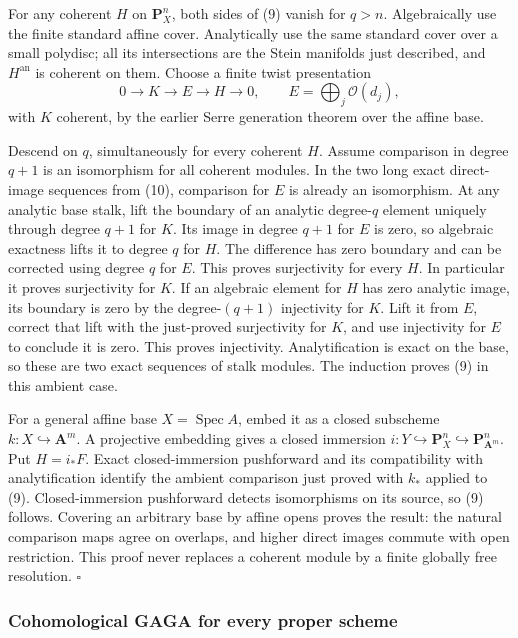 \documentclass[11pt]{article}
\begin{document}
For any coherent \(H\) on \(\mathbf P^n_X\), both sides of (9) vanish
for \(q>n\). Algebraically use the finite standard affine cover.
Analytically use the same standard cover over a small polydisc; all its
intersections are the Stein manifolds just described, and
\(H^{\mathrm{an}}\) is coherent on them. Choose a finite twist
presentation \[
0\to K\to E\to H\to0,
\qquad E=\bigoplus_j\mathcal O(d_j),
\tag{10}
\] with \(K\) coherent, by the earlier Serre generation theorem over the
affine base.

Descend on \(q\), simultaneously for every coherent \(H\). Assume
comparison in degree \(q+1\) is an isomorphism for all coherent modules.
In the two long exact direct-image sequences from (10), comparison for
\(E\) is already an isomorphism. At any analytic base stalk, lift the
boundary of an analytic degree-\(q\) element uniquely through degree
\(q+1\) for \(K\). Its image in degree \(q+1\) for \(E\) is zero, so
algebraic exactness lifts it to degree \(q\) for \(H\). The difference
has zero boundary and can be corrected using degree \(q\) for \(E\).
This proves surjectivity for every \(H\). In particular it proves
surjectivity for \(K\). If an algebraic element for \(H\) has zero
analytic image, its boundary is zero by the degree-\((q+1)\) injectivity
for \(K\). Lift it from \(E\), correct that lift with the just-proved
surjectivity for \(K\), and use injectivity for \(E\) to conclude it is
zero. This proves injectivity. Analytification is exact on the base, so
these are two exact sequences of stalk modules. The induction proves (9)
in this ambient case.

For a general affine base \(X=\operatorname{Spec}A\), embed it as a
closed subscheme \(k:X\hookrightarrow\mathbf A^m\). A projective
embedding gives a closed immersion
\(i:Y\hookrightarrow\mathbf P^n_X\hookrightarrow\mathbf P^n_{\mathbf A^m}\).
Put \(H=i_*F\). Exact closed-immersion pushforward and its compatibility
with analytification identify the ambient comparison just proved with
\(k_*\) applied to (9). Closed-immersion pushforward detects
isomorphisms on its source, so (9) follows. Covering an arbitrary base
by affine opens proves the result: the natural comparison maps agree on
overlaps, and higher direct images commute with open restriction. This
proof never replaces a coherent module by a finite globally free
resolution. \(\square\)

\subsubsection{Cohomological GAGA for every proper
scheme}\label{cohomological-gaga-for-every-proper-scheme}
\end{document}
